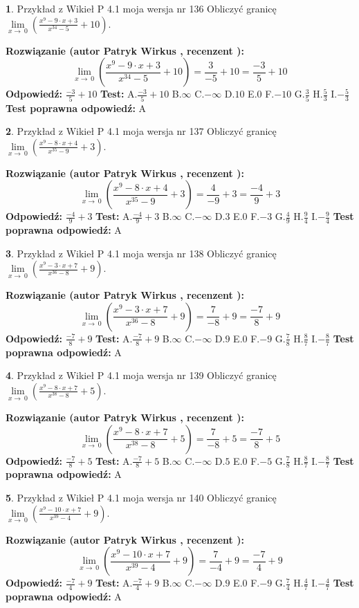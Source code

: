\documentclass[12pt, a4paper]{article}
\theoremstyle{definition} %
\newtheorem{zad}{}
\newcommand{\zadStart}[1]{\begin{zad}#1\newline}
\newcommand{\zadStop}{\end{zad}}
\newcommand{\rozwStart}[2]{\noindent \textbf{Rozwiązanie (autor #1 , recenzent #2): }\newline}
\newcommand{\rozwStop}{\newline}
\newcommand{\odpStart}{\noindent \textbf{Odpowiedź:}\newline}
\newcommand{\odpStop}{\newline}
\newcommand{\testStart}{\noindent \textbf{Test:}\newline}
\newcommand{\testStop}{\newline}
\newcommand{\kluczStart}{\noindent \textbf{Test poprawna odpowiedź:}\newline}
\newcommand{\kluczStop}{\newline}
\begin{document}
\zadStart{Przykład z Wikieł P 4.1 moja wersja nr 136}
Obliczyć granicę $\lim\limits_{x\to\ 0}(\frac{x^{9}-9 \cdot x +3}{x^{34}-5}+10)$.
\zadStop
\rozwStart{Patryk Wirkus}{}
$$\lim\limits_{x\to\ 0}(\frac{x^{9}-9 \cdot x +3}{x^{34}-5}+10)=\frac{3}{-5}+10=\frac{-3}{5}+10$$
\rozwStop
\odpStart
$\frac{-3}{5}+10$
\odpStop
\testStart
A.$\frac{-3}{5}+10$
B.$\infty$
C.$-\infty$
D.$10$
E.$0$
F.$-10$
G.$\frac{3}{5}$
H.$\frac{5}{3}$
I.$-\frac{5}{3}$
\testStop
\kluczStart
A
\kluczStop



\zadStart{Przykład z Wikieł P 4.1 moja wersja nr 137}
Obliczyć granicę $\lim\limits_{x\to\ 0}(\frac{x^{9}-8 \cdot x +4}{x^{35}-9}+3)$.
\zadStop
\rozwStart{Patryk Wirkus}{}
$$\lim\limits_{x\to\ 0}(\frac{x^{9}-8 \cdot x +4}{x^{35}-9}+3)=\frac{4}{-9}+3=\frac{-4}{9}+3$$
\rozwStop
\odpStart
$\frac{-4}{9}+3$
\odpStop
\testStart
A.$\frac{-4}{9}+3$
B.$\infty$
C.$-\infty$
D.$3$
E.$0$
F.$-3$
G.$\frac{4}{9}$
H.$\frac{9}{4}$
I.$-\frac{9}{4}$
\testStop
\kluczStart
A
\kluczStop



\zadStart{Przykład z Wikieł P 4.1 moja wersja nr 138}
Obliczyć granicę $\lim\limits_{x\to\ 0}(\frac{x^{9}-3 \cdot x +7}{x^{36}-8}+9)$.
\zadStop
\rozwStart{Patryk Wirkus}{}
$$\lim\limits_{x\to\ 0}(\frac{x^{9}-3 \cdot x +7}{x^{36}-8}+9)=\frac{7}{-8}+9=\frac{-7}{8}+9$$
\rozwStop
\odpStart
$\frac{-7}{8}+9$
\odpStop
\testStart
A.$\frac{-7}{8}+9$
B.$\infty$
C.$-\infty$
D.$9$
E.$0$
F.$-9$
G.$\frac{7}{8}$
H.$\frac{8}{7}$
I.$-\frac{8}{7}$
\testStop
\kluczStart
A
\kluczStop



\zadStart{Przykład z Wikieł P 4.1 moja wersja nr 139}
Obliczyć granicę $\lim\limits_{x\to\ 0}(\frac{x^{9}-8 \cdot x +7}{x^{38}-8}+5)$.
\zadStop
\rozwStart{Patryk Wirkus}{}
$$\lim\limits_{x\to\ 0}(\frac{x^{9}-8 \cdot x +7}{x^{38}-8}+5)=\frac{7}{-8}+5=\frac{-7}{8}+5$$
\rozwStop
\odpStart
$\frac{-7}{8}+5$
\odpStop
\testStart
A.$\frac{-7}{8}+5$
B.$\infty$
C.$-\infty$
D.$5$
E.$0$
F.$-5$
G.$\frac{7}{8}$
H.$\frac{8}{7}$
I.$-\frac{8}{7}$
\testStop
\kluczStart
A
\kluczStop



\zadStart{Przykład z Wikieł P 4.1 moja wersja nr 140}
Obliczyć granicę $\lim\limits_{x\to\ 0}(\frac{x^{9}-10 \cdot x +7}{x^{39}-4}+9)$.
\zadStop
\rozwStart{Patryk Wirkus}{}
$$\lim\limits_{x\to\ 0}(\frac{x^{9}-10 \cdot x +7}{x^{39}-4}+9)=\frac{7}{-4}+9=\frac{-7}{4}+9$$
\rozwStop
\odpStart
$\frac{-7}{4}+9$
\odpStop
\testStart
A.$\frac{-7}{4}+9$
B.$\infty$
C.$-\infty$
D.$9$
E.$0$
F.$-9$
G.$\frac{7}{4}$
H.$\frac{4}{7}$
I.$-\frac{4}{7}$
\testStop
\kluczStart
A
\kluczStop
\end{document}
